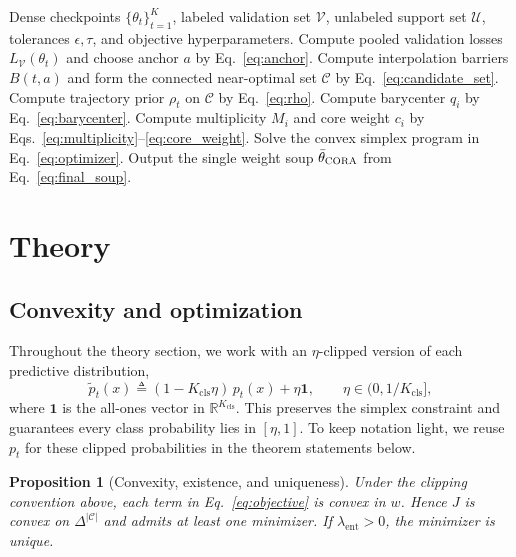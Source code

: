 \documentclass{article}
\newtheorem{proposition}{Proposition}
\newcommand{\RR}{\mathbb{R}}
\newcommand{\cC}{\mathcal{C}}
\newcommand{\cU}{\mathcal{U}}
\newcommand{\cV}{\mathcal{V}}
\newcommand{\cora}{\textup{\textsc{CORA}}}
\newcommand{\simplex}{\Delta}
\begin{document}
\begin{algorithm}[t]
    \caption{\cora{} (\textsc{Consensus-of-Rashomon Averaging})}
    \label{alg:cora}
    \begin{algorithmic}[1]
        \Require Dense checkpoints $\{\theta_t\}_{t=1}^{K}$, labeled validation set $\cV$, unlabeled support set $\cU$, tolerances $\epsilon,\tau$, and objective hyperparameters.
        \State Compute pooled validation losses $L_{\cV}(\theta_t)$ and choose anchor $a$ by Eq.~\eqref{eq:anchor}.
        \State Compute interpolation barriers $B(t,a)$ and form the connected near-optimal set $\cC$ by Eq.~\eqref{eq:candidate_set}.
        \State Compute trajectory prior $\rho_t$ on $\cC$ by Eq.~\eqref{eq:rho}.
        \For{each support example $x_i \in \cU$}
            \State Compute barycenter $q_i$ by Eq.~\eqref{eq:barycenter}.
            \State Compute multiplicity $M_i$ and core weight $c_i$ by Eqs.~\eqref{eq:multiplicity}--\eqref{eq:core_weight}.
        \EndFor
        \State Solve the convex simplex program in Eq.~\eqref{eq:optimizer}.
        \State Output the single weight soup $\bar\theta_{\cora}$ from Eq.~\eqref{eq:final_soup}.
    \end{algorithmic}
\end{algorithm}

\section{Theory}
\label{sec:theory}

\subsection{Convexity and optimization}

Throughout the theory section, we work with an $\eta$-clipped version of each predictive distribution,
\[
    \tilde p_t(x)
    \triangleq
    (1-K_{\mathrm{cls}}\eta)\,p_t(x) + \eta \mathbf{1},
    \qquad
    \eta \in (0,1/K_{\mathrm{cls}}],
\]
where $\mathbf{1}$ is the all-ones vector in $\RR^{K_{\mathrm{cls}}}$. This preserves the simplex constraint and guarantees every class probability lies in $[\eta,1]$. To keep notation light, we reuse $p_t$ for these clipped probabilities in the theorem statements below.

\begin{proposition}[Convexity, existence, and uniqueness]
\label{prop:convexity}
Under the clipping convention above, each term in Eq.~\eqref{eq:objective} is convex in $w$. Hence $J$ is convex on $\simplex^{|\cC|}$ and admits at least one minimizer. If $\lambda_{\mathrm{ent}} > 0$, the minimizer is unique.
\end{proposition}
\end{document}
